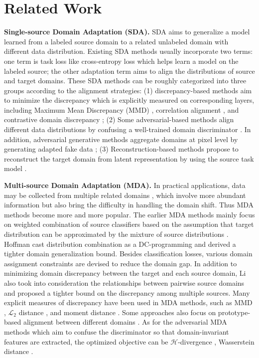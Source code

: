 \documentclass[10pt,twocolumn,letterpaper]{article}
\begin{document}
\section{Related Work}
\label{sec2}
\textbf{Single-source Domain Adaptation (SDA).} SDA aims to generalize a model learned from a labeled source domain to a related unlabeled domain with different data distribution. Existing SDA methods usually incorporate two terms: one term is task loss like cross-entropy loss which helps learn a model on the labeled source; the other adaptation term aims to align the distributions of source and target domains. These SDA methods can be roughly categorized into three groups according to the alignment strategies: (1) discrepancy-based methods aim to minimize the discrepancy which is explicitly measured on corresponding layers, including Maximum Mean Discrepancy (MMD) \cite{long2015learning}, correlation alignment \cite{sun2017correlation}, and contrastive domain discrepancy \cite{kang2019contrastive}; (2) Some adversarial-based methods align different data distributions by confusing a well-trained domain discriminator \cite{tzeng2017adversarial,tsai2018learning}. In addition, adversarial generative methods aggregate domains at pixel level by generating adapted fake data \cite{zhu2017unpaired}; (3) Reconstruction-based methods propose to reconstruct the target domain from latent representation by using the source task model \cite{ghifary2016deep}. \par
\textbf{Multi-source Domain Adaptation (MDA).} In practical applications, data may be collected from multiple related domains \cite{bhatt2016multi,sun2015survey}, which involve more abundant information but also bring the difficulty in handling the domain shift. Thus MDA methods become more and more popular. The earlier MDA methods mainly focus on weighted combination of source classifiers \cite{hoffman2018algorithms,li2018extracting,lee2019sliced,saito2018maximum} based on the assumption that target distribution can be approximated by the mixture of source distributions \cite{blitzer2007learning,ben-david2010a}. Hoffman \etal \cite{hoffman2018algorithms} cast distribution combination as a DC-programming and derived a tighter domain generalization bound. Besides classification losses, various domain assignment constraints are devised to reduce the domain gap. In addition to minimizing domain discrepancy between the target and each source domain, Li \etal \cite{li2018extracting} also took into consideration the relationships between pairwise source domains and proposed a tighter bound on the discrepancy among multiple sources. Many explicit measures of discrepancy have been used in MDA methods, such as MMD \cite{guo2018multi}, $\mathcal{L}_2$ distance \cite{rakshit2019unsupervised}, and moment distance \cite{peng2019moment}. Some approaches also focus on prototype-based alignment between different domains \cite{pan2019transferrable,xie2018learning,wang2020learning}. As for the adversarial MDA methods which aim to confuse the discriminator so that domain-invariant features are extracted, the optimized objective can be $\mathcal{H}$-divergence \cite{zhao2018adversarial}, Wasserstein distance \cite{zhao2020multi,li2018extracting}. \par
\end{document}
